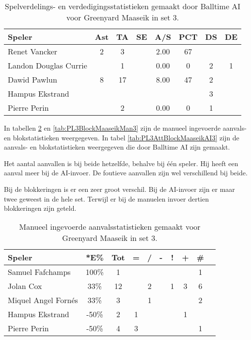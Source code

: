 \begin{table}[ht!]
  \centering
  \scriptsize
    \begin{tabular}{|l|c|c|c|c|c|c|c|} \hline
    \textbf{Speler} & Ast & TA & SE & A/S & PCT & DS & DE \\ \hline
    Renet Vancker & 2 & 3 &  & 2.00 & 67 &   &   \\
    Landon Douglas Currie &  & 1 &  & 0.00 & 0 & 2 & 1 \\
    Dawid Pawlun & 8 & 17 & & 8.00 & 47 & 2 &  \\
    Hampus Ekstrand &  &  &  &  &  & 3 &  \\
    Pierre Perin &  & 2 &  & 0.00 & 0 & 1 &  \\ \hline
  \end{tabular}
  \caption[Spelverdelings- en verdedigingsstatistieken gemaakt door Balltime AI voor Greenyard Maaseik in set 3]{\label{tab:PL3SetDigMaaseikAI3}Spelverdelings- en verdedigingsstatistieken gemaakt door Balltime AI voor Greenyard Maaseik in set 3.}
\end{table}

In tabellen \ref{tab:PL3AttMaaseikMan3} en \ref{tab:PL3BlockMaaseikMan3} zijn de manueel ingevoerde aanvals- en blokstatistieken weergegeven. In tabel \ref{tab:PL3AttBlockMaaseikAI3} zijn de aanvals- en blokstatistieken weergegeven die door Balltime AI zijn gemaakt. 

Het aantal aanvallen is bij beide hetzelfde, behalve bij één speler. Hij heeft een aanval meer bij de AI-invoer. De foutieve aanvallen zijn wel verschillend bij beide.

Bij de blokkeringen is er een zeer groot verschil. Bij de AI-invoer zijn er maar twee geweest in de hele set. Terwijl er bij de manuelen invoer dertien blokkeringen zijn geteld.

\begin{table}[ht!]
    \centering
    \scriptsize
    \begin{tabular}{|l|c|c|c|c|c|c|c|c|c|} \hline
        \textbf{Speler} & *E\% & Tot & = & / & - & ! & + & \#\\ \hline
        Samuel Fafchamps & 100\% & 1 &  &  &  &  &  & 1 \\ 
        Jolan Cox & 33\% & 12 &  & 2 &  & 1 & 3 & 6 \\ 
        Miquel Angel Fornés & 33\% & 3 &  & 1 &  &  &  & 2 \\ 
        Hampus Ekstrand & -50\% & 2 & 1 &  &  &  & 1 & \\ 
        Pierre Perin & -50\% & 4 & 3 &  &  &  &  & 1 \\ \hline
    \end{tabular}
    \caption[Manueel ingevoerde aanvalsstatistieken gemaakt Greenyard Maaseik in set 3]{\label{tab:PL3AttMaaseikMan3}Manueel ingevoerde aanvalsstatistieken gemaakt voor Greenyard Maaseik in set 3.}
\end{table}

